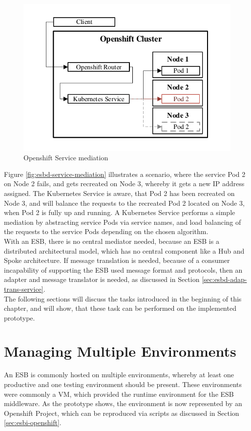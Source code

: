\begin{figure}[htbp]
	\centering
	\includegraphics[scale=1]{images/esbd-service-mediation.pdf}
	\caption{Openshift Service mediation}
	\label{fig:esbd-service-mediation}
\end{figure}

Figure \vref{fig:esbd-service-mediation} illustrates a scenario, where the service Pod 2 on Node 2 fails, and gets recreated on Node 3, whereby it gets a new IP address assigned. The Kubernetes Service is aware, that Pod 2 has been recreated on Node 3, and will balance the requests to the recreated Pod 2 located on Node 3, when Pod 2 is fully up and running. A Kubernetes Service performs a simple mediation by abstracting service Pods via service names, and load balancing of the requests to the service Pods depending on the chosen algorithm. \\

With an ESB, there is no central mediator needed, because an ESB is a distributed architectural model, which has no central component like a Hub and Spoke architecture. If message translation is needed, because of a consumer incapability of supporting the ESB used message format and protocols, then an adapter and message translator is needed, as discussed in Section \vref{sec:esbd-adap-trans-service}. \\

The following sections will discuss the tasks introduced in the beginning of this chapter, and will show, that these task can be performed on the implemented prototype.

\section{Managing Multiple Environments}
\label{sec:esbd-multiple-env}
An ESB is commonly hosted on multiple environments, whereby at least one productive and one testing environment should be present. These environments were commonly a VM, which provided the runtime environment for the ESB middleware. As the prototype shows, the environment is now represented by an Openshift Project, which can be reproduced via scripts as discussed in Section \vref{sec:esbi-openshift}. \\

